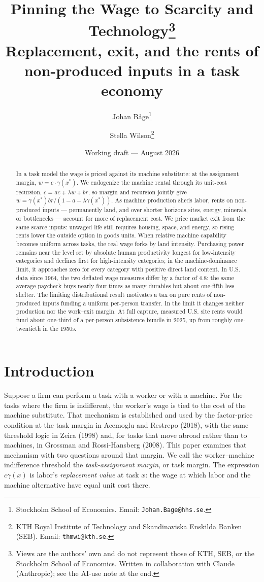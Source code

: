 \documentclass[12pt]{article}
\title{\bfseries Pinning the Wage to Scarcity and Technology\thanks{Views are the
  authors' own and do not represent those of KTH, SEB, or the Stockholm School of
  Economics. Written in collaboration with Claude (Anthropic); see the AI-use note
  at the end.
  }\\[7pt]
  \large\mdseries Replacement, exit, and the rents of non-produced inputs in a task economy}
\author{
  Johan B\r{a}ge\thanks{Stockholm School of Economics.
    Email: \texttt{Johan.Bage@hhs.se}.
  }
  \and
  Stella Wilson\thanks{KTH Royal Institute of Technology and Skandinaviska
    Enskilda Banken (SEB). Email: \texttt{thmwi@kth.se}.}
}
\date{Working draft --- August 2026}
\theoremstyle{plain}
\begin{document}
\maketitle

\begin{abstract}
\noindent In a task model the wage is priced against its machine substitute: at the assignment margin, $w=c\cdot\gamma(x^*)$. We endogenize the machine rental through its unit-cost recursion, $c=ac+\lambda w+br$, so margin and recursion jointly give $w=\gamma(x^*)br/(1-a-\lambda\gamma(x^*))$. As machine production sheds labor, rents on non-produced inputs --- permanently land, and over shorter horizons sites, energy, minerals, or bottlenecks --- account for more of replacement cost. We price market exit from the same scarce inputs: unwaged life still requires housing, space, and energy, so rising rents lower the outside option in goods units. When relative machine capability becomes uniform across tasks, the real wage forks by land intensity. Purchasing power remains near the level set by absolute human productivity longest for low-intensity categories and declines first for high-intensity categories; in the machine-dominance limit, it approaches zero for every category with positive direct land content. In U.S. data since 1964, the two deflated wage measures differ by a factor of 4.8: the same average paycheck buys nearly four times as many durables but about one-fifth less shelter. The limiting distributional result motivates a tax on pure rents of non-produced inputs funding a uniform per-person transfer. In the limit it changes neither production nor the work--exit margin. At full capture, measured U.S. site rents would fund about one-third of a per-person subsistence bundle in 2025, up from roughly one-twentieth in the 1950s.
\end{abstract}

\section{Introduction}\label{sec:intro}

Suppose a firm can perform a task with a worker or with a machine. For the tasks where the firm is indifferent, the worker's wage is tied to the cost of the machine substitute. That mechanism is established and used by the factor-price condition at the task margin in Acemoglu and Restrepo (2018), with the same threshold logic in Zeira (1998) and, for tasks that move abroad rather than to machines, in Grossman and Rossi-Hansberg (2008). This paper examines that mechanism with two questions around that margin. We call the worker--machine indifference threshold the \emph{task-assignment margin}, or task margin. The expression $c\gamma(x)$ is labor's \emph{replacement value} at task $x$: the wage at which labor and the machine alternative have equal unit cost there.
\end{document}
